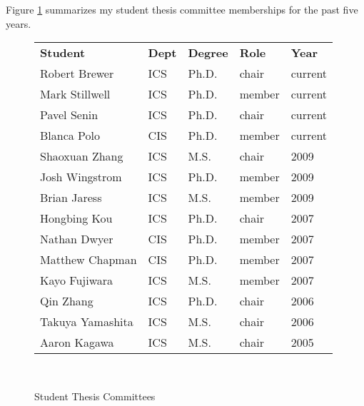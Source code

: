 \documentclass[11pt]{article}
\begin{document}
\noindent Figure \ref{fig:student-committees} summarizes my student thesis committee memberships for the past five years. 

\begin{figure}[!ht]
\small
\begin{tabular}{p{3in}llll} \hline
{\bf Student} & {\bf Dept} & {\bf Degree} & {\bf Role} & {\bf Year}  \\
 Robert Brewer &  ICS &  Ph.D. &  chair &  current \\
 Mark Stillwell &  ICS &  Ph.D. &  member &  current \\
 Pavel Senin &  ICS &  Ph.D. &  chair &  current \\
 Blanca Polo &  CIS &  Ph.D. & member &  current \\
 Shaoxuan Zhang &  ICS &  M.S. & chair &  2009 \\
 Josh Wingstrom &  ICS &  Ph.D. & member &  2009 \\
 Brian Jaress &  ICS &  M.S. &  member &  2009 \\
 Hongbing Kou &  ICS &  Ph.D. &  chair &  2007  \\
 Nathan Dwyer &  CIS &  Ph.D. & member &  2007 \\
 Matthew Chapman &  CIS &  Ph.D. & member &  2007 \\
 Kayo Fujiwara &  ICS &  M.S. & member &  2007 \\
 Qin Zhang &  ICS &  Ph.D. &  chair &  2006 \\
 Takuya Yamashita &  ICS &  M.S. &  chair &  2006 \\
 Aaron Kagawa &  ICS &  M.S. &  chair &  2005 \\ \hline
\end{tabular} \\ 
\caption{Student Thesis Committees}
\label{fig:student-committees}
\normalsize
\end{figure}
\end{document}
